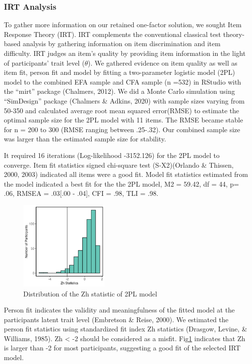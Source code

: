 \documentclass[
  man]{apa6}
\begin{document}
\hypertarget{irt-analysis}{%
\subsubsection{IRT Analysis}\label{irt-analysis}}

To gather more information on our retained one-factor solution, we sought Item Response Theory (IRT). IRT complements the conventional classical test theory-based analysis by gathering information on item discrimination and item difficulty. IRT judges an item's quality by providing item information in the light of participants' trait level (\(\theta\)). We gathered evidence on item quality as well as item fit, person fit and model by fitting a two-parameter logistic model (2PL) model to the combined EFA sample and CFA sample (n =532) in RStudio with the ``mirt'' package (Chalmers, 2012). We did a Monte Carlo simulation using ``SimDesign'' package (Chalmers \& Adkins, 2020) with sample sizes varying from 50-350 and calculated average root mean squared error(RMSE) to estimate the optimal sample size for the 2PL model with 11 items. The RMSE became stable for n = 200 to 300 (RMSE ranging between .25-.32). Our combined sample size was larger than the estimated sample size for stability.

It required 16 iterations (Log-likelihood -3152.126) for the 2PL model to converge. Item fit statistics signed chi-square test (S-X2)(Orlando \& Thissen, 2000, 2003) indicated all items were a good fit. Model fit statistics estimated from the model indicated a best fit for the the 2PL model, M2 = 59.42, df = 44, p= .06, RMSEA = .03{[}.00 - .04{]}, CFI = .98, TLI = .98.

\begin{figure}
\includegraphics[width=1.75in]{Figures/300/Figure4} \caption{Distribution of the Zh statistic of 2PL model}\label{fig:figfmisfit}
\end{figure}

Person fit indicates the validity and meaningfulness of the fitted model at the participants latent trait level (Embretson \& Reise, 2000). We estimated the person fit statistics using standardized fit index Zh statistics (Drasgow, Levine, \& Williams, 1985). Zh \textless{} -2 should be considered as a misfit. Fig\ref{fig:figfmisfit} indicates that Zh is larger than -2 for most participants, suggesting a good fit of the selected IRT model.
\end{document}
